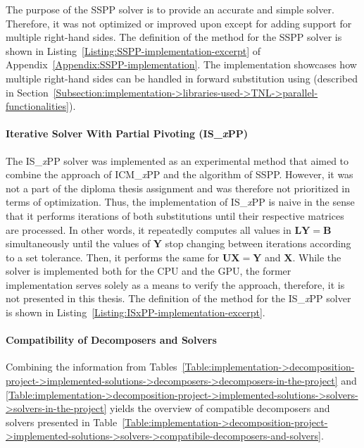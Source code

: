 The purpose of the SSPP solver is to provide an accurate and simple solver. Therefore, it was not optimized or improved upon except for adding support for multiple right-hand sides. The definition of the  method for the SSPP solver is shown in Listing~\ref{Listing:SSPP-implementation-excerpt} of Appendix~\ref{Appendix:SSPP-implementation}. The implementation showcases how multiple right-hand sides can be handled in forward substitution using  (described in Section~\ref{Subsection:implementation->libraries-used->TNL->parallel-functionalities}).

\paragraph{Iterative Solver With Partial Pivoting (IS\_\textit{x}PP)} The IS\_\textit{x}PP solver was implemented as an experimental method that aimed to combine the approach of ICM\_\textit{x}PP and the algorithm of SSPP. However, it was not a part of the diploma thesis assignment and was therefore not prioritized in terms of optimization. Thus, the implementation of IS\_\textit{x}PP is naive in the sense that it performs iterations of both substitutions until their respective matrices are processed. In other words, it repeatedly computes all values in $\mathbf{LY} = \mathbf{B}$ simultaneously until the values of $\mathbf{Y}$ stop changing between iterations according to a set tolerance. Then, it performs the same for $\mathbf{UX} = \mathbf{Y}$ and $\mathbf{X}$. While the solver is implemented both for the CPU and the GPU, the former implementation serves solely as a means to verify the approach, therefore, it is not presented in this thesis. The definition of the  method for the IS\_\textit{x}PP solver is shown in Listing~\ref{Listing:ISxPP-implementation-excerpt}.

\paragraph{Compatibility of Decomposers and Solvers} Combining the information from Tables~\ref{Table:implementation->decomposition-project->implemented-solutions->decomposers->decomposers-in-the-project} and \ref{Table:implementation->decomposition-project->implemented-solutions->solvers->solvers-in-the-project} yields the overview of compatible decomposers and solvers presented in Table~\ref{Table:implementation->decomposition-project->implemented-solutions->solvers->compatibile-decomposers-and-solvers}.

